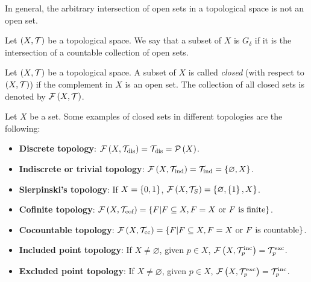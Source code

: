 In general, the arbitrary intersection of open sets in a topological space is not an open set.

\begin{definition}
  Let $\left(X,\mathcal{T}\right)$ be a topological space. We say that a subset of $X$ is $G_{\delta}$ if it is the intersection of a countable collection of open sets.
\end{definition}

\begin{definition}
  Let $\left(X,\mathcal{T}\right)$ be a topological space. A subset of $X$ is called \emph{closed} (with respect to $\left(X,\mathcal{T}\right)$) if the complement in $X$ is an open set. The collection of all closed sets is denoted by $\mathcal{F}\left(X,\mathcal{T}\right)$.
\end{definition}

\begin{example}
  Let $X$ be a set. Some examples of closed sets in different topologies are the following:
  \begin{itemize}
      \item \textbf{Discrete topology}: $\mathcal{F}\left(X,\mathcal{T}_{\text{dis}}\right)=\mathcal{T}_{\text{dis}}=\mathcal{P}\left(X\right)$.
      \item \textbf{Indiscrete or trivial topology}: $\mathcal{F}\left(X,\mathcal{T}_{\text{ind}}\right)=\mathcal{T}_{\text{ind}}=\left\{\varnothing,X\right\}$.
      \item \textbf{Sierpinski's topology}: If $X=\left\{0,1\right\}$, $\mathcal{F}\left(X,\mathcal{T}_S\right)=\left\{\varnothing,\left\{1\right\},X\right\}$.
      \item \textbf{Cofinite topology}: $\mathcal{F}\left(X,\mathcal{T}_{\text{cof}}\right)=\left\{F\middle|F\subseteq X,F=X\text{ or }F\text{ is finite}\right\}$.
      \item \textbf{Cocountable topology}: $\mathcal{F}\left(X,\mathcal{T}_{\text{cc}}\right)=\left\{F\middle|F\subseteq X,F=X\text{ or }F\text{ is countable}\right\}$.
      \item \textbf{Included point topology}: If $X\neq\varnothing$, given $p\in X$, $\mathcal{F}\left(X,\mathcal{T}_p^{\text{inc}}\right)=\mathcal{T}_p^{\text{exc}}$.
      \item \textbf{Excluded point topology}: If $X\neq\varnothing$, given $p\in X$, $\mathcal{F}\left(X,\mathcal{T}_p^{\text{exc}}\right)=\mathcal{T}_p^{\text{inc}}$.
  \end{itemize}
\end{example}

